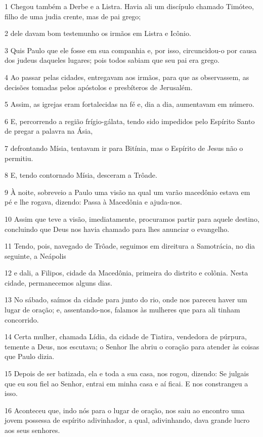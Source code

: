 \par 1 Chegou também a Derbe e a Listra. Havia ali um discípulo chamado Timóteo, filho de uma judia crente, mas de pai grego;
\par 2 dele davam bom testemunho os irmãos em Listra e Icônio.
\par 3 Quis Paulo que ele fosse em sua companhia e, por isso, circuncidou-o por causa dos judeus daqueles lugares; pois todos sabiam que seu pai era grego.
\par 4 Ao passar pelas cidades, entregavam aos irmãos, para que as observassem, as decisões tomadas pelos apóstolos e presbíteros de Jerusalém.
\par 5 Assim, as igrejas eram fortalecidas na fé e, dia a dia, aumentavam em número.
\par 6 E, percorrendo a região frígio-gálata, tendo sido impedidos pelo Espírito Santo de pregar a palavra na Ásia,
\par 7 defrontando Mísia, tentavam ir para Bitínia, mas o Espírito de Jesus não o permitiu.
\par 8 E, tendo contornado Mísia, desceram a Trôade.
\par 9 À noite, sobreveio a Paulo uma visão na qual um varão macedônio estava em pé e lhe rogava, dizendo: Passa à Macedônia e ajuda-nos.
\par 10 Assim que teve a visão, imediatamente, procuramos partir para aquele destino, concluindo que Deus nos havia chamado para lhes anunciar o evangelho.
\par 11 Tendo, pois, navegado de Trôade, seguimos em direitura a Samotrácia, no dia seguinte, a Neápolis
\par 12 e dali, a Filipos, cidade da Macedônia, primeira do distrito e colônia. Nesta cidade, permanecemos alguns dias.
\par 13 No sábado, saímos da cidade para junto do rio, onde nos pareceu haver um lugar de oração; e, assentando-nos, falamos às mulheres que para ali tinham concorrido.
\par 14 Certa mulher, chamada Lídia, da cidade de Tiatira, vendedora de púrpura, temente a Deus, nos escutava; o Senhor lhe abriu o coração para atender às coisas que Paulo dizia.
\par 15 Depois de ser batizada, ela e toda a sua casa, nos rogou, dizendo: Se julgais que eu sou fiel ao Senhor, entrai em minha casa e aí ficai. E nos constrangeu a isso.
\par 16 Aconteceu que, indo nós para o lugar de oração, nos saiu ao encontro uma jovem possessa de espírito adivinhador, a qual, adivinhando, dava grande lucro aos seus senhores.
